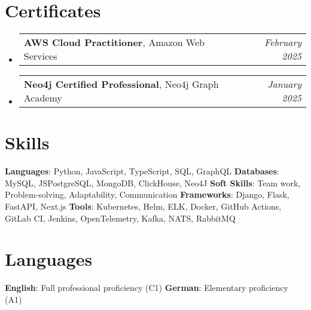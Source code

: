\documentclass[letterpaper,11pt]{article}
\makeatletter
\newcommand{\resumeSubHeadingListStart}{\begin{itemize}[leftmargin=*]}
\newcommand{\resumeSubHeadingListEnd}{\end{itemize}}
\newcommand{\titleWithDescription}[2]{\textbf{#1}{: #2}}
\newcommand{\resumeLanguages}[4]{
  \section{Languages}
    \noindent
    \titleWithDescription{#1}{#2}
    \hfill
    \titleWithDescription{#3}{#4}
}
\newcommand{\certificateItem}[3]{
  \item\begin{tabular*}{0.97\textwidth}{l@{\extracolsep{\fill}}r}
    \small{
      \textbf{#1}{, #2 \vspace{-2pt}}
    } & \textit{\small #3} \\
  \end{tabular*}\vspace{-5pt}
}
\makeatother
\begin{document}
\section{Certificates}
  \resumeSubHeadingListStart

    \certificateItem
      {AWS Cloud Practitioner}
      {Amazon Web Services}
      {February 2025}\vspace{3px}

    \certificateItem
      {Neo4j Certified Professional}
      {Neo4j Graph Academy}
      {January 2025}

  \resumeSubHeadingListEnd

%
\section{Skills}

  \titleWithDescription{Languages}{Python, JavaScript, TypeScript, SQL, GraphQL}\vspace{3pt}
  \hfill
  \titleWithDescription{Databases}{MySQL, JSPostgreSQL, MongoDB, ClickHouse, Neo4J}
  \newline
  \titleWithDescription{Soft Skills}{Team work, Problem-solving, Adaptability, Communication}
  \hfill
  \titleWithDescription{Frameworks}{Django, Flask, FastAPI, Next.js}\vspace{3pt}
  \newline
  \titleWithDescription{Tools}{Kubernetes, Helm, ELK, Docker, GitHub Actions, GitLab CI, Jenkins, OpenTelemetry, Kafka, NATS, RabbitMQ}
\resumeLanguages
  {English}
  {Full professional proficiency (C1)}
  {German}
  {Elementary proficiency (A1)}
\end{document}
